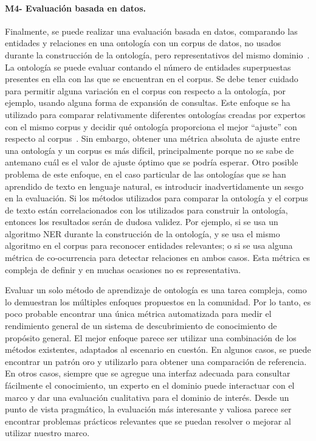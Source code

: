 \paragraph{M4- Evaluación basada en datos.}

Finalmente, se puede realizar una evaluación basada en datos, comparando las entidades y relaciones en una ontología con un corpus de datos, no usados durante la construcción de la ontología, pero representativos del mismo dominio~\cite{brank2005survey}.
La ontología se puede evaluar contando el número de entidades superpuestas presentes en ella con las que se encuentran en el corpus.
Se debe tener cuidado para permitir alguna variación en el corpus con respecto a la ontología, por ejemplo, usando alguna forma de expansión de consultas.
Este enfoque se ha utilizado para comparar relativamente diferentes ontologías creadas por expertos con el mismo corpus y decidir qué ontología proporciona el mejor ``ajuste'' con respecto al corpus~\cite{brewster2004data}.
Sin embargo, obtener una métrica absoluta de ajuste entre una ontología y un corpus es más difícil, principalmente porque no se sabe de antemano cuál es el valor de ajuste óptimo que se podría esperar.
Otro posible problema de este enfoque, en el caso particular de las ontologías que se han aprendido de texto en lenguaje natural, es introducir inadvertidamente un sesgo en la evaluación.
Si los métodos utilizados para comparar la ontología y el corpus de texto están correlacionados con los utilizados para construir la ontología, entonces los resultados serán de dudosa validez.
Por ejemplo, si se usa un algoritmo NER durante la construcción de la ontología, y se usa el mismo algoritmo en el corpus para reconocer entidades relevantes; o si se usa alguna métrica de co-ocurrencia para detectar relaciones en ambos casos.
Esta métrica es compleja de definir y en muchas ocasiones no es representativa.

\vspace{1em}

Evaluar un solo método de aprendizaje de ontología es una tarea compleja, como lo demuestran los múltiples enfoques propuestos en la comunidad.
Por lo tanto, es poco probable encontrar una única métrica automatizada para medir el rendimiento general de un sistema de descubrimiento de conocimiento de propósito general.
El mejor enfoque parece ser utilizar una combinación de los métodos existentes, adaptados al escenario en cuestón.
En algunos casos, se puede encontrar un patrón oro y utilizarlo para obtener una comparación de referencia.
En otros casos, siempre que se agregue una interfaz adecuada para consultar fácilmente el conocimiento, un experto en el dominio puede interactuar con el marco y dar una evaluación cualitativa para el dominio de interés.
Desde un punto de vista pragmático, la evaluación más interesante y valiosa parece ser encontrar problemas prácticos relevantes que se puedan resolver o mejorar al utilizar nuestro marco.

